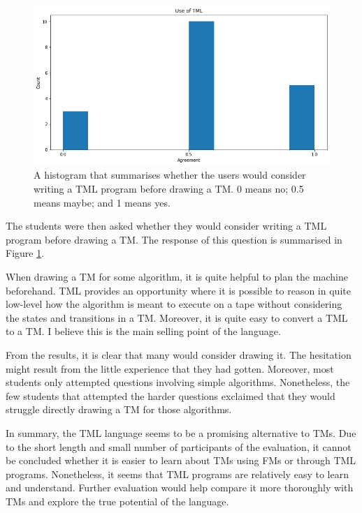 \begin{figure}[htb]
    \centering
    \includegraphics[scale=0.35]{images/use-tml.png}
    \caption{A histogram that summarises whether the users would consider writing a TML program before drawing a TM. 0 means no; 0.5 means maybe; and 1 means yes.}
    \label{fig:use-tml}
\end{figure}

The students were then asked whether they would consider writing a TML program before drawing a TM. The response of this question is summarised in Figure \ref{fig:use-tml}. 

When drawing a TM for some algorithm, it is quite helpful to plan the machine beforehand. TML provides an opportunity where it is possible to reason in quite low-level how the algorithm is meant to execute on a tape without considering the states and transitions in a TM. Moreover, it is quite easy to convert a TML to a TM. I believe this is the main selling point of the language. 

From the results, it is clear that many would consider drawing it. The hesitation might result from the little experience that they had gotten. Moreover, most students only attempted questions involving simple algorithms. Nonetheless, the few students that attempted the harder questions exclaimed that they would struggle directly drawing a TM for those algorithms.

In summary, the TML language seems to be a promising alternative to TMs. Due to the short length and small number of participants of the evaluation, it cannot be concluded whether it is easier to learn about TMs using FMs or through TML programs. Nonetheless, it seems that TML programs are relatively easy to learn and understand. Further evaluation would help compare it more thoroughly with TMs and explore the true potential of the language.

